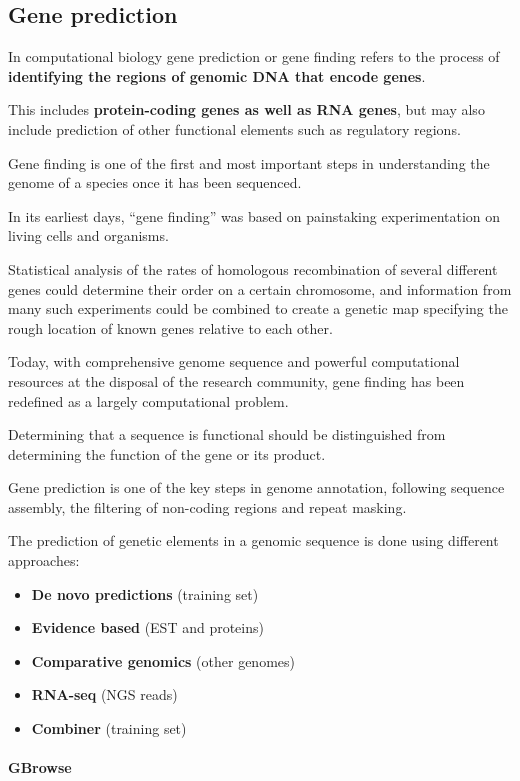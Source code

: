 \subsection{Gene prediction}

In computational biology gene prediction or gene finding refers to the process
of \textbf{identifying the regions of genomic DNA that encode genes}.

This includes \textbf{protein-coding genes as well as RNA genes}, but may also
include prediction of other functional elements such as regulatory regions.

Gene finding is one of the first and most important steps in understanding
the genome of a species once it has been sequenced.

In its earliest days, ``gene finding'' was based on painstaking experimentation
on living cells and organisms.

Statistical analysis of the rates of homologous recombination of several
different genes could determine their order on a certain chromosome, and
information from many such experiments could be combined to create a genetic
map specifying the rough location of known genes relative to each other.

Today, with comprehensive genome sequence and powerful computational resources
at the disposal of the research community,
gene finding has been redefined as a largely computational problem.

Determining that a sequence is functional should be distinguished from
determining the function of the gene or its product.

Gene prediction is one of the key steps in genome annotation, following
sequence assembly, the filtering of non-coding regions and repeat masking.

The prediction of genetic elements in a genomic sequence is done using
different approaches:

\begin{itemize}
  \item \textbf{De novo predictions} (training set)
  \item \textbf{Evidence based} (EST and proteins)
  \item \textbf{Comparative genomics} (other genomes)
  \item \textbf{RNA-seq} (NGS reads)
  \item \textbf{Combiner} (training set)
\end{itemize}

\paragraph*{GBrowse}

